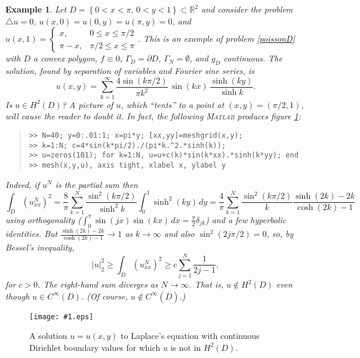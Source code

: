 \documentclass[12pt]{amsart}
\newtheorem{example}{Example}
\theoremstyle{definition}
\newcommand{\regfigure}[2]{\texttt{[image: \#1.eps]}}
\newcommand{\lap}{\triangle}
\newcommand{\Matlab}{\textsc{Matlab}\xspace}
\newcommand{\RR}{\mathbb{R}}
\begin{document}
\begin{example}  Let $D=\left\{0<x<\pi, \,0<y<1\right\}\subset \RR^2$ and consider the problem $\lap u=0$, $u(x,0)=u(0,y)=u(\pi,y)=0$, and $u(x,1)=\begin{cases} x, & 0\le x \le \pi/2 \\ \pi-x, &\pi/2\le x \le \pi\end{cases}$.  This is an example of problem \eqref{poissonD} with $D$ a convex polygon, $f\equiv 0$, $\Gamma_D=\partial D$, $\Gamma_N=\emptyset$, and $g_D$ continuous.  The solution, found by separation of variables and Fourier sine series, is
\begin{equation}\label{seriesforu}
u(x,y)= \sum_{k=1}^\infty \frac{4 \sin(k\pi/2)}{\pi k^2}\, \sin(kx)\,\frac{\sinh(ky)}{\sinh k}.
\end{equation}
Is $u\in H^2(D)$?  A picture of $u$, which ``tents'' to a point at $(x,y)=(\pi/2,1)$, will cause the reader to doubt it.  In fact, the following \Matlab produces figure \ref{fig:tent}:
\small\begin{quote}\begin{verbatim}
>> N=40; y=0:.01:1; x=pi*y; [xx,yy]=meshgrid(x,y); 
>> k=1:N; c=4*sin(k*pi/2)./(pi*k.^2.*sinh(k));
>> u=zeros(101); for k=1:N, u=u+c(k)*sin(k*xx).*sinh(k*yy); end
>> mesh(x,y,u), axis tight, xlabel x, ylabel y
\end{verbatim}
\end{quote}\normalsize

Indeed, if $u^N$ is the partial sum then
    $$\int_D (u_{xx}^N)^2 = \frac{8}{\pi} \sum_{k=1}^N \frac{\sin^2(k\pi/2)}{\sinh^2 k} \int_0^1 \sinh^2(ky)\,dy = \frac{4}{\pi} \sum_{k=1}^N \frac{\sin^2(k\pi/2)}{k} \frac{\sinh(2k)-2k}{\cosh(2k)-1}$$
using orthogonality ($\int_0^\pi \sin(jx)\sin(kx)\,dx = \frac{\pi}{2}\delta_{jk}$) and a few hyperbolic identities.  But $\frac{\sinh(2k)-2k}{\cosh(2k)-1} \to 1$ as $k\to\infty$ and also $\sin^2(2j\pi/2)=0$, so, by Bessel's inequality,
    $$|u|_2^2 \ge \int_D (u_{xx}^N)^2 \ge c \sum_{j=1}^N \frac{1}{2j-1},$$
for $c>0$.  The right-hand sum diverges as $N\to \infty$.  That is, $u\notin H^2(D)$ even though $u\in C^\infty(D)$.  (Of course, $u\notin C^\infty(\overline{D})$.)\end{example}

\begin{figure}[ht]
\regfigure{tent}{2.6}
\caption{A solution $u=u(x,y)$ to Laplace's equation with continuous Dirichlet boundary values for which $u$ is not in $H^2(D)$.} 
\label{fig:tent}
\end{figure}
\end{document}
